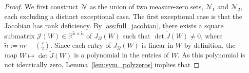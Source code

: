 \documentclass{article}
\begin{document}
\begin{proof}





We first construct $\mathcal{N}$ as the union of two measure-zero sets, $\mathcal{N}_1$ and $\mathcal{N}_2$, each excluding a distinct exceptional case. The first exceptional case is that the Jacobian has rank deficiency. By \ref{ass:full_jacobian}, there exists a square submatrix 
$\mathcal{J}(W) \in \mathbb{R}^{\widetilde{n} \times \widetilde{n}}$
of $J_{\Omega}(W)$ such that $\det \widetilde{J}(W) \neq 0$, where $\widetilde{n} := nr - \binom{r}{2}$. Since each entry of $J_{\Omega}(W)$ is linear in $W$ by definition, the map $W \mapsto \det \widetilde{J}(W)$ is a polynomial in the entries of $W$. As this polynomial is not identically zero, Lemma~\ref{lem:sym_polyzeros} implies that


\end{proof}
\end{document}
